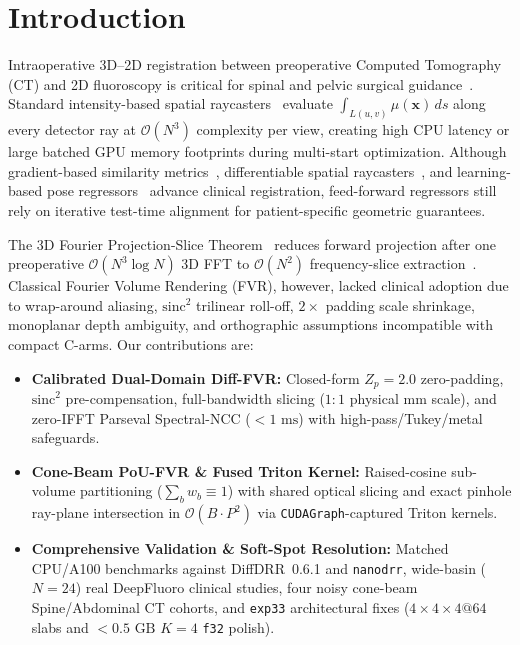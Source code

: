 \documentclass[runningheads]{llncs}
\begin{document}
\section{Introduction}
Intraoperative 3D--2D registration between preoperative Computed Tomography (CT) and 2D fluoroscopy is critical for spinal and pelvic surgical guidance~\cite{markelj2012review,van2018evaluation,knez2020computer}. Standard intensity-based spatial raycasters~\cite{unberath2021impact,siddon1985fast,gopalakrishnan2022drr,killeen2023diffdrr} evaluate $\int_{L(u,v)} \mu(\mathbf{x})\,ds$ along every detector ray at $\mathcal{O}(N^3)$ complexity per view, creating high CPU latency or large batched GPU memory footprints during multi-start optimization. Although gradient-based similarity metrics~\cite{penney1998comparison,maes1997multimodality}, differentiable spatial raycasters~\cite{gao2020prost,killeen2023diffdrr,gopalakrishnan2024xvr,nanodrr2025}, and learning-based pose regressors~\cite{miao2016cnn,liao2019multiview,liu2026pivots} advance clinical registration, feed-forward regressors still rely on iterative test-time alignment for patient-specific geometric guarantees.

The 3D Fourier Projection-Slice Theorem~\cite{malzbender1993fourier} reduces forward projection after one preoperative $\mathcal{O}(N^3 \log N)$ 3D FFT to $\mathcal{O}(N^2)$ frequency-slice extraction~\cite{abdellah2015gpu,reddy1996fft}. Classical Fourier Volume Rendering (FVR), however, lacked clinical adoption due to wrap-around aliasing, $\mathrm{sinc}^2$ trilinear roll-off, $2\times$ padding scale shrinkage, monoplanar depth ambiguity, and orthographic assumptions incompatible with compact C-arms. Our contributions are:
\begin{itemize}
    \item \textbf{Calibrated Dual-Domain Diff-FVR:} Closed-form $Z_p{=}2.0$ zero-padding, $\mathrm{sinc}^2$ pre-compensation, full-bandwidth slicing ($1:1$ physical mm scale), and zero-IFFT Parseval Spectral-NCC ($<1\text{ ms}$) with high-pass/Tukey/metal safeguards.
    \item \textbf{Cone-Beam PoU-FVR \& Fused Triton Kernel:} Raised-cosine sub-volume partitioning ($\sum_b w_b \equiv 1$) with shared optical slicing and exact pinhole ray-plane intersection in $\mathcal{O}(B \cdot P^2)$ via \texttt{CUDAGraph}-captured Triton kernels.
    \item \textbf{Comprehensive Validation \& Soft-Spot Resolution:} Matched CPU/A100 benchmarks against DiffDRR~0.6.1 and \texttt{nanodrr}, wide-basin ($N{=}24$) real DeepFluoro clinical studies, four noisy cone-beam Spine/Abdominal CT cohorts, and \texttt{exp33} architectural fixes ($4{\times}4{\times}4@64$ slabs and $<0.5\text{ GB}$ $K{=}4$ \texttt{f32} polish).
\end{itemize}
\end{document}
